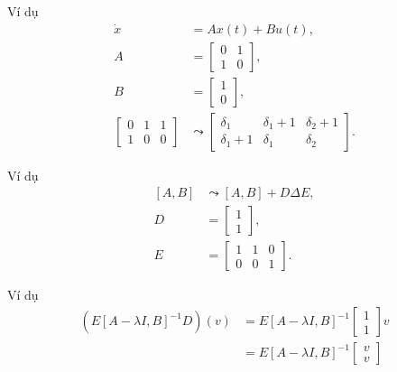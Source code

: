 \begin{frame}{Ví dụ}
    \begin{align}
        \dot{x}&=Ax\left(t\right)+Bu\left(t\right), \\
        A&=\left[\begin{array}{cc}
        0 & 1\\
        1 & 0
        \end{array}\right],\\
        B &=\left[\begin{array}{c}
        1\\
        0
        \end{array}\right],\\
        \left[\begin{array}{ccc}
        0 & 1 & 1\\
        1 & 0 & 0
        \end{array}\right]&\leadsto\left[\begin{array}{ccc}
        \delta_{1} & \delta_{1}+1 & \delta_{2}+1\\
        \delta_{1}+1 & \delta_{1} & \delta_{2}
        \end{array}\right].
    \end{align}
\end{frame}

\begin{frame}{Ví dụ}
    \begin{align}
        \left[A,B\right]&\leadsto\left[A,B\right]+D\Delta E, \\
        D&=\left[\begin{array}{c}
        1\\
        1
        \end{array}\right],\\
        E&=\left[\begin{array}{ccc}
        1 & 1 & 0\\
        0 & 0 & 1
        \end{array}\right].
    \end{align}
\end{frame}


\begin{frame}{Ví dụ}
    \begin{align}
        \left(E\left[A-\lambda I,B\right]^{-1}D\right)\left(v\right)
        &= E\left[A-\lambda I,B\right]^{-1}\left[\begin{array}{c}
1\\ 1\end{array}\right]v \nonumber\\
        &= E\left[A-\lambda I,B\right]^{-1}\left[\begin{array}{c}
v\\
v\end{array}\right]
    \end{align}
\end{frame}

